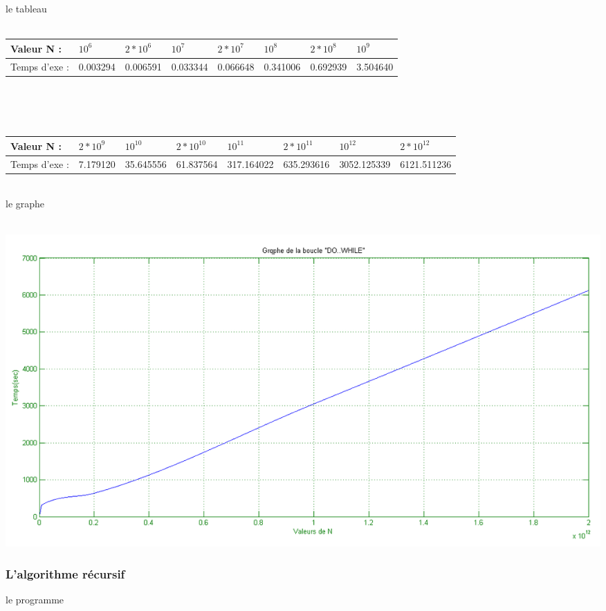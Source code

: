 \documentclass[•]{article}
\begin{document}
\textrm{  }

le tableau
\\
\\
\color{blue}
\begin{tabular}{ |p{2cm}||p{1.6cm}|p{1.6cm}|p{1.6cm}|p{1.6cm}|p{1.6cm}|p{1.6cm}|p{1.6cm}| }
 \hline
 Valeur N : & $10^6$& $2*10^6$& $10^7$& $2*10^7$& $10^8$& $2*10^8$& $10^9$ \\
 \hline
 Temps d'exe : & 0.003294 & 0.006591 & 0.033344 & 0.066648 & 0.341006 & 0.692939 &  3.504640 \\
 \hline
\end{tabular}
\\
\\
\\
\begin{tabular}{ |p{2cm}||p{1.6cm}|p{1.6cm}|p{1.6cm}|p{1.6cm}|p{1.6cm}|p{1.6cm}|p{1.6cm}| }
\hline
Valeur N : & $2*10^9$& $10^{10}$& $2*10^{10}$& $10^{11}$& $2*10^{11}$& $10^{12}$& $2*10^{12}$ \\
 \hline
Temps d'exe : &  7.179120 & 35.645556 & 61.837564 & 317.164022 & 635.293616 & 3052.125339 & 6121.511236  \\
\hline
\end{tabular}

\color{black}

\textrm{  }
\\

le graphe 

\textrm{  }
\\
\includegraphics[width=1\textwidth]{graphe/do_while.png}

\subsubsection{L'algorithme récursif}

le programme
\end{document}
